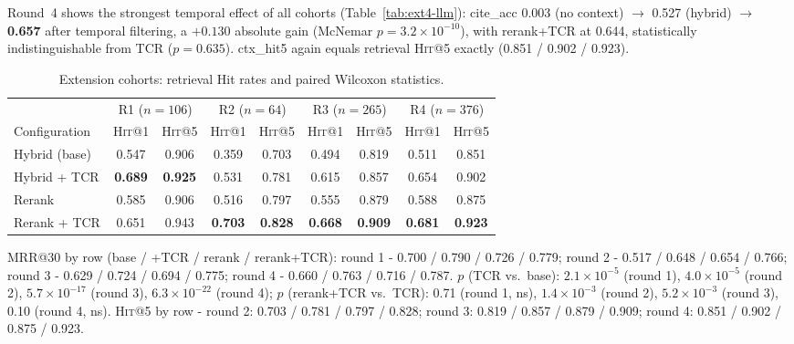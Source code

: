 \documentclass[10pt,a4paper,twocolumn]{article}
\newcommand{\hit}{\textsc{Hit}}
\begin{document}
Round~4 shows the strongest temporal effect of all cohorts (Table~\ref{tab:ext4-llm}): cite\_acc 0.003 (no context) $\rightarrow$ 0.527 (hybrid) $\rightarrow$ \textbf{0.657} after temporal filtering, a $+0.130$ absolute gain (McNemar $p=3.2\times10^{-10}$), with rerank+TCR at 0.644, statistically indistinguishable from TCR ($p=0.635$). ctx\_hit5 again equals retrieval \hit{}@5 exactly (0.851 / 0.902 / 0.923).

\begin{table}[t]
\centering\scriptsize
\caption{Extension cohorts: retrieval Hit rates and paired Wilcoxon statistics.}
\label{tab:ext}
\setlength{\tabcolsep}{2.2pt}
\begin{tabular}{lcccccccc}
\toprule
 & \multicolumn{2}{c}{R1 ($n{=}106$)} & \multicolumn{2}{c}{R2 ($n{=}64$)} & \multicolumn{2}{c}{R3 ($n{=}265$)} & \multicolumn{2}{c}{R4 ($n{=}376$)} \\
\cmidrule(lr){2-3}\cmidrule(lr){4-5}\cmidrule(lr){6-7}\cmidrule(lr){8-9}
Configuration & \hit{}@1 & \hit{}@5 & \hit{}@1 & \hit{}@5 & \hit{}@1 & \hit{}@5 & \hit{}@1 & \hit{}@5 \\
\midrule
Hybrid (base) & 0.547 & 0.906 & 0.359 & 0.703 & 0.494 & 0.819 & 0.511 & 0.851 \\
Hybrid + TCR & \textbf{0.689} & \textbf{0.925} & 0.531 & 0.781 & 0.615 & 0.857 & 0.654 & 0.902 \\
Rerank & 0.585 & 0.906 & 0.516 & 0.797 & 0.555 & 0.879 & 0.588 & 0.875 \\
Rerank + TCR & 0.651 & 0.943 & \textbf{0.703} & \textbf{0.828} & \textbf{0.668} & \textbf{0.909} & \textbf{0.681} & \textbf{0.923} \\
\bottomrule
\end{tabular}

\vspace{3pt}
{\footnotesize MRR@30 by row (base / +TCR / rerank / rerank+TCR): round 1 - 0.700 / 0.790 / 0.726 / 0.779; round 2 - 0.517 / 0.648 / 0.654 / 0.766; round 3 - 0.629 / 0.724 / 0.694 / 0.775; round 4 - 0.660 / 0.763 / 0.716 / 0.787. $p$ (TCR vs.\ base): $2.1\times10^{-5}$ (round 1), $4.0\times10^{-5}$ (round 2), $5.7\times10^{-17}$ (round 3), $6.3\times10^{-22}$ (round 4); $p$ (rerank+TCR vs.\ TCR): 0.71 (round 1, ns), $1.4\times10^{-3}$ (round 2), $5.2\times10^{-3}$ (round 3), 0.10 (round 4, ns). \hit{}@5 by row - round 2: 0.703 / 0.781 / 0.797 / 0.828; round 3: 0.819 / 0.857 / 0.879 / 0.909; round 4: 0.851 / 0.902 / 0.875 / 0.923.}
\end{table}
\end{document}
